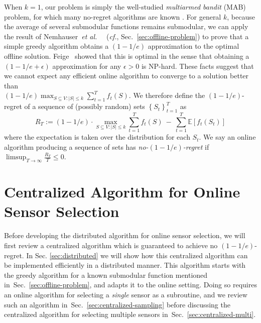 \documentclass{sig-alternate-dan}
\numberwithin{equation}{section}
\newcommand{\sensors}{V}
\newcommand{\obj}{\ensuremath{f}} %
\newcommand{\K}{\ensuremath{k}}
\newcommand{\regret}{\ensuremath{R}}
\newcommand{\ignore}[1]{}
\newcommand{\cf}{\emph{cf.}}
\def \etal {\emph{et al.}\ }
\newcommand{\secref}[1]{Sec.~\ref{#1}}
\newcommand{\class} [1] {\textrm{#1}} %
\newcommand{\NP} {\class{NP}}
\newcommand{\paren} [1] {\ensuremath{ \left( {#1} \right) }}
\newcommand{\set}[1]{\ensuremath{\left\{#1\right\}}}
\newcommand{\E}[1]{\ensuremath{\mathbb{E}\left[#1\right] }}
\begin{document}
When $\K=1$, our problem is
simply the well-studied \emph{multiarmed bandit} (MAB) problem, for
which many no-regret algorithms are known \cite{foster99}.  For
general $\K$, because the average of several submodular functions
remains submodular, we can apply the result of
Nemhauser~\etal~\cite{nemhauser78} (\cf, \secref{sec:offline-problem})
to prove that a simple greedy algorithm obtains a $(1-1/e)$
approximation to the optimal offline solution.
%
%
%
%
Feige~\cite{feige97} showed that this is optimal in the sense that
obtaining a \\$(1-1/e+\epsilon)$ approximation for any $\epsilon > 0$ is
\NP-hard.  These facts suggest that we cannot expect any efficient
online algorithm to converge to a solution better than\\
$(1-1/e)\max_{S \subseteq \sensors: |S| \le \K} \sum_{t=1}^T
\obj_t(S)$.  We therefore define the $(1-1/e)$-regret of a sequence of
(possibly random) sets $\set{S_t}_{t=1}^T$ as
\vspace{-0.5em}
\[
\regret_{T} := \paren{1-1/e} \cdot \max_{S \subseteq \sensors: |S| \le \K}
\sum_{t=1}^T \obj_t(S) \ - \ \sum_{t=1}^T \E{\obj_t(S_t)} 
\]
where the expectation is taken over the distribution for each $S_t$.
We say an online algorithm producing a sequence of sets has 
\emph{no-$(1-1/e)$-regret} if $\limsup_{T \to \infty}
\frac{\regret_{T}}{T} \le 0$. 
%
%
%


%
%
%
%
%
%
%
%
%
%



\ignore{
\begin{itemize}
\item Define sensor selection problem as online optimization problem
\item Objective functions are submodular (examples; mention Nemhauser result)
\item Define $(1-1/e)$-regret
\end{itemize}
} %


%
%
%
%
%
%


%

%
%

\section{Centralized Algorithm for Online Sensor Selection}\label{sec:centralized}
Before developing the distributed algorithm for online sensor
selection, we will first review a centralized algorithm which is
guaranteed to achieve no $(1-1/e)$-regret. In
Sec. \ref{sec:distributed} we will show how this centralized algorithm
can be implemented efficiently in a distributed manner. This 
algorithm starts with the greedy algorithm for a known submodular
function mentioned in~\secref{sec:offline-problem}, and adapts it to the
online setting. 
Doing so requires an online algorithm for selecting a
\emph{single} sensor as a subroutine, and we review such an algorithm 
in~\secref{sec:centralized-sampling} before discussing the centralized
algorithm for selecting multiple sensors in~\secref{sec:centralized-multi}.
\end{document}
